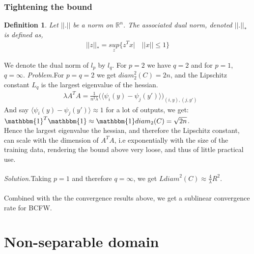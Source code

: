 \documentclass{article}
\newtheorem{definition}{Definition}
\begin{document}
\subsubsection{Tightening the bound}
\begin{definition}
Let $||.||$ be a norm on $\mathbb{R}^{n}$. The associated dual norm, denoted $||.||_{*}$ is defined as,
\begin{equation*}
\begin{aligned}
    ||z||_{*}= \underset{z}{\textit{sup}} \{z^{T}x|\quad||x||\leq1\}
\end{aligned}
\end{equation*}
\end{definition} 
We denote the dual norm of $l_{p}$ by $l_{q}$. For $p=2$ we have $q=2$ and for $p=1$, $q=\infty$.
\textit{Problem.}\quad For $p= q= 2$ we get $\textit{diam}_{2}^{2}(C)= 2n$, and the Lipschitz constant $L_{q}$ is the largest eigenvalue of the hessian.
\begin{equation*}
\begin{aligned}
    &\lambda A^{T}A= \frac{1}{n^{2}\lambda}\Big(\langle \psi_{i}(y)- \psi_{j}(y\prime) \rangle\Big)_{(i,y),(j,y\prime)}
\end{aligned} 
\end{equation*}
And say $\langle \psi_{i}(y)- \psi_{j}(y\prime) \rangle \approx  1$ for a lot of outputs, we get: $\mathbbm{1}^{T}\mathbbm{1}\approx \mathbbm{1}diam_{2}(C)=\sqrt{2n}$.\\
Hence the largest eigenvalue the hessian, and therefore the Lipschitz constant, can scale with the dimension of $A^{T}A$, i.e exponentially with the size of the training data, rendering the bound above very loose, and thus of little practical use.
\\
\\
\textit{Solution.}\quad Taking $p=1$ and therefore $q=\infty$, we get $L\textit{diam}^{2}(C)\approx \frac{4}{\lambda}R^{2}$.\\
\\
Combined with the the convergence results above, we get a sublinear convergence rate for BCFW.
\section{Non-separable domain}
\end{document}
